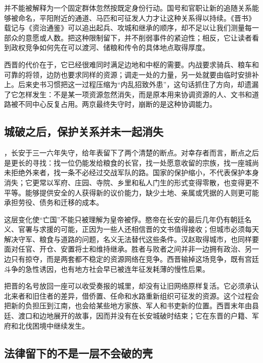 并不能被解释为一个固定群体忽然按既定身份行动。国号和官职让新的追随关系能够被命名，平阳附近的通道、马匹和可征发人力才让这种关系得以持续。《晋书》载记与《资治通鉴》可以追出起兵、攻城和继承的顺序，却不足以让我们测量每一部众的意愿或人数。把这种限制留下，并不削弱事件的紧迫性；相反，它让读者看到政权竞争如何先在可以渡河、储粮和传令的具体地点取得厚度。

西晋的代价在于，它已经很难同时满足边地和中枢的需要。内战要求骑兵、粮车和可靠的将领，边防也要求同样的资源；调走一处的力量，另一处就要由临时安排补上。后来史书习惯把这一过程压缩为“内乱招致外患”，这句话抓住了方向，却遗漏了它怎样发生：不是某一项资源忽然消失，而是原本用来协调资源的人、文书和道路被不同中心反复占用。两京最终失守时，崩断的是这种协调能力。

\subsection{城破之后，保护关系并未一起消失}

，长安于三一六年失守，给年表留下了两个清楚的断点。对幸存者而言，断点之后是更长的寻找：找一位仍能发给粮食的长官，找一处愿意收留的宗族，找一座城尚未拒绝外来者，找一条不必经过交战军队的路。国家的保护缩小，不代表保护本身消失；它更常以军府、庄园、寺院、乡里和私人门生的形式变得零散，也变得更不平等。能够提供安全的人获得新的议价能力，缺少土地、亲属或凭据的人则更可能承担劳役、债务和迁移的成本。

这层变化使“亡国”不能只被理解为皇帝被俘。愍帝在长安的最后几年仍有朝廷名义、官署与求援的可能，正因为一些人还相信晋的文书值得接收；但城市必须每天解决守军、粮食与道路的问题，名义无法替代这些条件。汉赵取得城市，也同样要面对任官、开仓、安置将士和维持继承。胜者与败者之间并非一边拥有政治、另一边只有掠夺，而是两套都不稳定的资源网络在竞争。西晋输掉这场竞争，既有宫廷斗争的急性诱因，也有地方社会早已被连年征发耗薄的慢性后果。

把晋的名号放回一座可以收受奏报的城里，却没有让旧网络原样复活。它必须承认北来者和旧住者的差异，借侨置、任命和水路重新组织可征发的资源。这个过程会把新的负担压到江南，也会给某些地方家族、军人和书吏新的位置。西晋末年由县廷、渡口和边地展开的故事，因而并没有在长安城破时结束；它在东晋的户籍、军府和北伐困境中继续发生。

\subsection{法律留下的不是一层不会破的壳}

